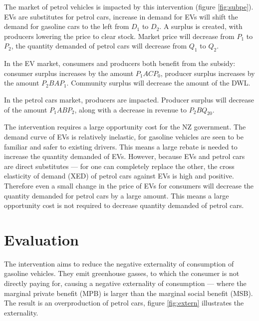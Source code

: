 \documentclass[a4paper,12pt]{article}
\begin{document}
The market of petrol vehicles is impacted by this intervention (figure \ref{fig:subpe}). EVs are substitutes for petrol cars, increase in demand for EVs will shift the demand for gasoline cars to the left from $D_1$ to $D_2$. A surplus is created, with producers lowering the price to clear stock. Market price will decrease from $P_1$ to $P_2$, the quantity demanded of petrol cars will decrease from $Q_1$ to $Q_2$.


In the EV market, consumers and producers both benefit from the subsidy: consumer surplus increases by the amount $P_1ACP_0$, producer surplus increases by the amount $P_2BAP_1$. Community surplus will decrease the amount of the DWL.

In the petrol cars market, producers are impacted. Producer surplus will decrease of the amount $P_1ABP_2$, along with a decrease in revenue to $P_2BQ_20$.

The intervention requires a large opportunity cost for the NZ government. The demand curve of EVs is relatively inelastic, for gasoline vehicles are seen to be familiar and safer to existing drivers. This means a large rebate is needed to increase the quantity demanded of EVs. However, because EVs and petrol cars are direct substitutes --- for one can completely replace the other, the cross elasticity of demand (XED) of petrol cars against EVs is high and positive. Therefore even a small change in the price of EVs for consumers will decrease the quantity demanded for petrol cars by a large amount. This means a large opportunity cost is not required to decrease quantity demanded of petrol cars.

\section*{Evaluation}

The intervention aims to reduce the negative externality of consumption of gasoline vehicles. They emit greenhouse gasses, to which the consumer is not directly paying for, causing a negative externality of consumption --- where the marginal private benefit (MPB) is larger than the marginal social benefit (MSB). The result is an overproduction of petrol cars, figure \ref{fig:extern} illustrates the externality.
\end{document}
